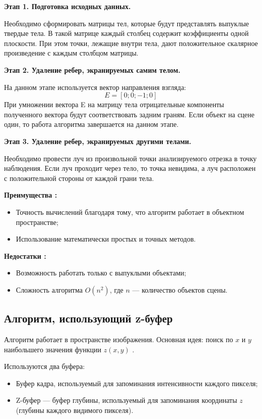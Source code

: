 \textbf{Этап 1. Подготовка исходных данных.}

Необходимо сформировать матрицы тел, которые будут представлять выпуклые твердые тела. В такой матрице каждый столбец содержит коэффициенты одной плоскости. При этом точки, лежащие внутри тела, дают положительное скалярное произведение с каждым столбцом матрицы.

\textbf{Этап 2. Удаление ребер, экранируемых самим телом.}

На данном этапе используется вектор направления взгляда: 
$$ E = [0; 0; -1; 0]$$
При умножении вектора E на матрицу тела отрицательные компоненты полученного вектора будут соответствовать задним граням. Если объект на сцене один, то работа алгоритма завершается на данном этапе.

\textbf{Этап 3. Удаление ребер, экранируемых другими телами.}

Необходимо провести луч из произвольной точки анализируемого отрезка в точку наблюдения. Если луч проходит через тело, то точка невидима, а луч расположен с положительной стороны от каждой грани тела.

\textbf{Преимущества \cite{rojers}:}
\begin{itemize}[label=---]
	\item Точность вычислений благодаря тому, что алгоритм работает в объектном пространстве;
	\item Использование математически простых и точных методов.
\end{itemize}

\textbf{Недостатки \cite{rojers}:}
\begin{itemize}[label=---]
	\item Возможность работать только с выпуклыми объектами;
	\item Сложность алгоритма $O(n^2)$, где $n$ --- количество объектов сцены.
\end{itemize}

\subsection{Алгоритм, использующий z-буфер}

Алгоритм работает в пространстве изображения. Основная идея: поиск по $x$ и $y$ наибольшего значения функции $z(x,y)$ \cite{lectures}.

Используются два буфера:
\begin{itemize}[label=---]
	\item Буфер кадра, используемый для запоминания интенсивности каждого пикселя;
	\item Z-буфер --- буфер глубины, используемый для запоминания координаты $z$ (глубины каждого видимого пикселя).
\end{itemize}

